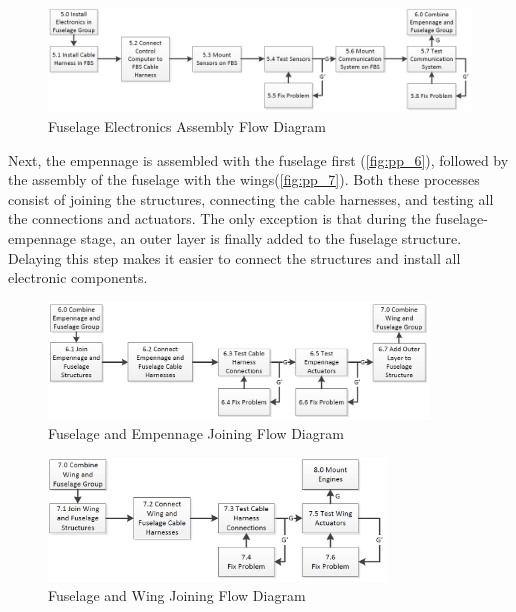 \begin{figure}[H]
    \centering
    \includegraphics[width=\textwidth]{ProductionPlan/Figures/pp_5}
    \caption{Fuselage Electronics Assembly Flow Diagram}
    \label{fig:pp_5}
\end{figure}

Next, the empennage is assembled with the fuselage first (\autoref{fig:pp_6}), followed by the assembly of the fuselage with the wings(\autoref{fig:pp_7}). Both these processes consist of joining the structures, connecting the cable harnesses, and testing all the connections and actuators. The only exception is that during the fuselage-empennage stage, an outer layer is finally added to the fuselage structure. Delaying this step makes it easier to connect the structures and install all electronic components.

\begin{figure}[H]
    \centering
    \includegraphics[width=0.9\textwidth]{ProductionPlan/Figures/pp_6}
    \caption{Fuselage and Empennage Joining Flow Diagram}
    \label{fig:pp_6}
\end{figure}

\begin{figure}[H]
    \centering
    \includegraphics[width=0.8\textwidth]{ProductionPlan/Figures/pp_7}
    \caption{Fuselage and Wing Joining Flow Diagram}
    \label{fig:pp_7}
\end{figure}

